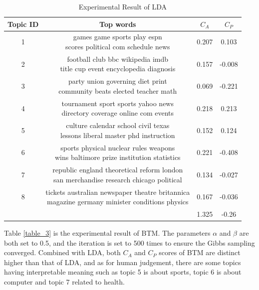 \begin{table}[htbp]
\centering
\begin{tabular}{|c|c|c|c|}
\hline
Topic ID & Top words & $C_A$ & $C_P$\\
\hline
1 & \tabincell{l}{games game sports play espn \\scores political com schedule news} & 0.207 & 0.103\\
\hline
2 & \tabincell{l}{football club bbc wikipedia imdb \\title cup event encyclopedia diagnosis} & 0.157 & -0.008\\
\hline
3 &\tabincell{l}{party union governing diet print \\community beats elected teacher math} & 0.069 & -0.221\\
\hline
4 & \tabincell{l}{tournament sport sports yahoo news \\directory coverage online com events} & 0.218 & 0.213\\
\hline
5 & \tabincell{l}{culture calendar school civil texas \\lessons liberal master phd instruction} & 0.152 & 0.124\\
\hline
6 & \tabincell{l}{sports physical nuclear rules weapons \\wins baltimore prize institution statistics} & 0.221 & -0.408\\
\hline
7 & \tabincell{l}{republic england theoretical reform london \\san merchandise research chicago political} & 0.134 & -0.027\\
\hline
8 & \tabincell{l}{tickets australian newspaper theatre britannica \\magazine germany minister conditions physics} & 0.167 & -0.036\\
\hline
 & & 1.325 & -0.26\\
\hline
\end{tabular}
\caption{Experimental Result of LDA}
\label{table_2}
\end{table}

Table \ref{table_3} is the experimental result of BTM. The parameters $\alpha$ and $\beta$ are both set to 0.5, and the iteration is set to 500 times to ensure the Gibbs sampling converged. Combined with LDA, both $C_A$ and $C_P$ scores of BTM are distinct higher than that of LDA, and as for human judgement, there are some topics having interpretable meaning such as topic 5 is about sports, topic 6 is about computer and topic 7 related to health.

